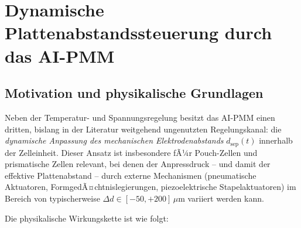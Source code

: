 ﻿\documentclass[12pt,a4paper]{article}
\begin{document}
\section{Dynamische Plattenabstandssteuerung durch das AI-PMM}
\label{sec:plattenabstand}

\subsection{Motivation und physikalische Grundlagen}

Neben der Temperatur- und Spannungsregelung besitzt das AI-PMM einen dritten,
bislang in der Literatur weitgehend ungenutzten Regelungskanal: die \textit{dynamische
Anpassung des mechanischen Elektrodenabstands} $d_\mathrm{sep}(t)$ innerhalb
der Zelleinheit. Dieser Ansatz ist insbesondere fÃ¼r Pouch-Zellen und prismatische
Zellen relevant, bei denen der Anpressdruck -- und damit der effektive Plattenabstand
-- durch externe Mechanismen (pneumatische Aktuatoren, FormgedÃ¤chtnislegierungen,
piezoelektrische Stapelaktuatoren) im Bereich von typischerweise
$\Delta d \in [-50, +200]\,\mu\mathrm{m}$ variiert werden kann.

Die physikalische Wirkungskette ist wie folgt:
\end{document}
